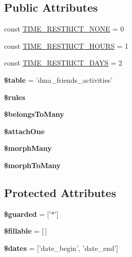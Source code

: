 \subsection*{Public Attributes}
\begin{DoxyCompactItemize}
\item 
const \hyperlink{classDMA_1_1Friends_1_1Models_1_1Activity_ab9dd8b18c4810beabdcf8e45039913c8}{T\-I\-M\-E\-\_\-\-R\-E\-S\-T\-R\-I\-C\-T\-\_\-\-N\-O\-N\-E} = 0
\item 
const \hyperlink{classDMA_1_1Friends_1_1Models_1_1Activity_ac78040e8784e02c2d1bcce5221ac6cb8}{T\-I\-M\-E\-\_\-\-R\-E\-S\-T\-R\-I\-C\-T\-\_\-\-H\-O\-U\-R\-S} = 1
\item 
const \hyperlink{classDMA_1_1Friends_1_1Models_1_1Activity_a71b85478f20cda144aeffe010364a0f7}{T\-I\-M\-E\-\_\-\-R\-E\-S\-T\-R\-I\-C\-T\-\_\-\-D\-A\-Y\-S} = 2
\item 
\hypertarget{classDMA_1_1Friends_1_1Models_1_1Activity_a2ded517047c73d831aef535c8adc6690}{{\bfseries \$table} = 'dma\-\_\-friends\-\_\-activities'}\label{classDMA_1_1Friends_1_1Models_1_1Activity_a2ded517047c73d831aef535c8adc6690}

\item 
{\bfseries \$rules}
\item 
{\bfseries \$belongs\-To\-Many}
\item 
{\bfseries \$attach\-One}
\item 
{\bfseries \$morph\-Many}
\item 
{\bfseries \$morph\-To\-Many}
\end{DoxyCompactItemize}
\subsection*{Protected Attributes}
\begin{DoxyCompactItemize}
\item 
\hypertarget{classDMA_1_1Friends_1_1Models_1_1Activity_ac82a10f722788b5c1c7a5295e1ac10c2}{{\bfseries \$guarded} = \mbox{[}'$\ast$'\mbox{]}}\label{classDMA_1_1Friends_1_1Models_1_1Activity_ac82a10f722788b5c1c7a5295e1ac10c2}

\item 
\hypertarget{classDMA_1_1Friends_1_1Models_1_1Activity_ab2a7401215dff9dfd8b600247b12454a}{{\bfseries \$fillable} = \mbox{[}$\,$\mbox{]}}\label{classDMA_1_1Friends_1_1Models_1_1Activity_ab2a7401215dff9dfd8b600247b12454a}

\item 
\hypertarget{classDMA_1_1Friends_1_1Models_1_1Activity_afe94503fbf177345e4bf0b1625dee499}{{\bfseries \$dates} = \mbox{[}'date\-\_\-begin', 'date\-\_\-end'\mbox{]}}\label{classDMA_1_1Friends_1_1Models_1_1Activity_afe94503fbf177345e4bf0b1625dee499}

\end{DoxyCompactItemize}


